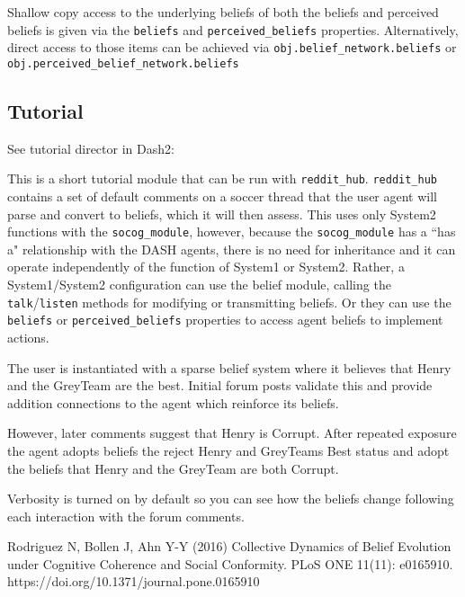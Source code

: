 \documentclass[11pt, a4paper]{article}
\begin{document}
Shallow copy access to the underlying beliefs of both the beliefs and perceived beliefs is given via the \texttt{beliefs} and \texttt{perceived\_beliefs} properties. Alternatively, direct access to those items can be achieved via \texttt{obj.belief\_network.beliefs} or \texttt{obj.perceived\_belief\_network.beliefs}

\subsection{Tutorial}
See tutorial director in Dash2:

This is a short tutorial module that can be run with \texttt{reddit\_hub}.
\texttt{reddit\_hub} contains a set of default comments on a soccer thread that
the user agent will parse and convert to beliefs, which it will then
assess. This uses only System2 functions with the \texttt{socog\_module}, however,
because the \texttt{socog\_module} has a ``has a" relationship with the DASH agents,
there is no need for inheritance and it can operate independently of the
function of System1 or System2. Rather, a System1/System2 configuration
can use the belief module, calling the \texttt{talk}/\texttt{listen} methods for modifying or
transmitting beliefs. Or they can use the \texttt{beliefs} or \texttt{perceived\_beliefs}
properties to access agent beliefs to implement actions.

The user is instantiated with a sparse belief system where it believes that
Henry and the GreyTeam are the best. Initial forum posts validate this and
provide addition connections to the agent which reinforce its beliefs.

However, later comments suggest that Henry is Corrupt. After repeated
exposure the agent adopts beliefs the reject Henry and GreyTeams Best status
and adopt the beliefs that Henry and the GreyTeam are both Corrupt.

Verbosity is turned on by default so you can see how the beliefs change
following each interaction with the forum comments.












\begin{thebibliography}{1}
 Rodriguez N, Bollen J, Ahn Y-Y (2016) Collective Dynamics of Belief Evolution under Cognitive Coherence and Social Conformity. PLoS ONE 11(11): e0165910. https://doi.org/10.1371/journal.pone.0165910
\end{thebibliography}
\end{document}
